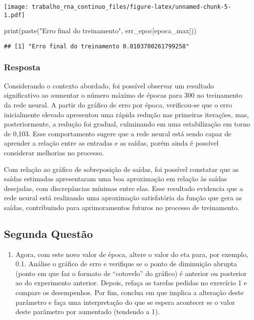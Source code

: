 \documentclass[
]{article}
\newenvironment{Shaded}{\begin{snugshade}}{\end{snugshade}}
\newcommand{\FunctionTok}[1]{\textcolor[rgb]{0.00,0.00,0.00}{#1}}
\newcommand{\NormalTok}[1]{#1}
\newcommand{\StringTok}[1]{\textcolor[rgb]{0.31,0.60,0.02}{#1}}
\providecommand{\tightlist}{%
  \setlength{\itemsep}{0pt}\setlength{\parskip}{0pt}}
\begin{document}
\texttt{[image: trabalho\_rna\_continuo\_files/figure-latex/unnamed-chunk-5-1.pdf]}

\begin{Shaded}
\begin{Highlighting}[]
\FunctionTok{print}\NormalTok{(}\FunctionTok{paste}\NormalTok{(}\StringTok{"Erro final do treinamento"}\NormalTok{, err\_epoc[epoca\_max]))}
\end{Highlighting}
\end{Shaded}

\begin{verbatim}
## [1] "Erro final do treinamento 0.0103700261799258"
\end{verbatim}

\hypertarget{resposta}{%
\subsubsection{Resposta}\label{resposta}}

Considerando o contexto abordado, foi possível observar um resultado
significativo ao aumentar o número máximo de épocas para 300 no
treinamento da rede neural. A partir do gráfico de erro por época,
verificou-se que o erro inicialmente elevado apresentou uma rápida
redução nas primeiras iterações, mas, posteriormente, a redução foi
gradual, culminando em uma estabilização em torno de 0,103. Esse
comportamento sugere que a rede neural está sendo capaz de aprender a
relação entre as entradas e as saídas, porém ainda é possível considerar
melhorias no processo.

Com relação ao gráfico de sobreposição de saídas, foi possível constatar
que as saídas estimadas apresentaram uma boa aproximação em relação às
saídas desejadas, com discrepâncias mínimas entre elas. Esse resultado
evidencia que a rede neural está realizando uma aproximação satisfatória
da função que gera as saídas, contribuindo para aprimoramentos futuros
no processo de treinamento.

\hypertarget{segunda-questuxe3o}{%
\subsection{Segunda Questão}\label{segunda-questuxe3o}}

\begin{enumerate}
\def\labelenumi{\arabic{enumi})}
\setcounter{enumi}{1}
\tightlist
\item
  Agora, com este novo valor de época, altere o valor do eta para, por
  exemplo, 0.1. Análise o gráfico de erro e verifique se o ponto de
  diminuição abrupta (ponto em que faz o formato de ``cotovelo'' do
  gráfico) é anterior ou posterior ao do experimento anterior. Depois,
  refaça as tarefas pedidas no exercício 1 e compare os desempenhos. Por
  fim, conclua em que implica a alteração deste parâmetro e faça uma
  interpretação do que se espera acontecer se o valor deste parâmetro
  por aumentado (tendendo a 1).
\end{enumerate}
\end{document}
